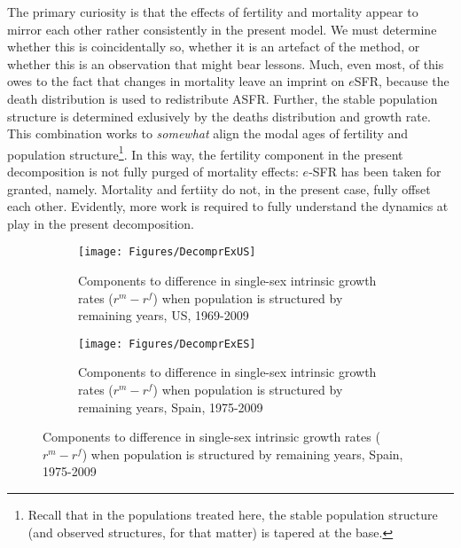 The primary curiosity is that the effects of fertility and mortality appear to
mirror each other rather consistently in the present model. We must determine
whether this is coincidentally so, whether it is an artefact of the method, or
whether this is an observation that might bear lessons. Much, even most, of this
owes to the fact that changes in mortality leave an imprint on $e$SFR, because
the death distribution is used to redistribute ASFR. Further, the stable
population structure is determined exlusively by the deaths distribution and
growth rate. This combination works to \textit{somewhat} align the modal ages of
fertility and population structure\footnote{Recall that in the populations
treated here, the stable population structure (and observed structures, for
that matter) is tapered at the base.}. In this way, the fertility component in
the present decomposition is not fully purged of mortality effects: $e$-SFR has
been taken for granted, namely. Mortality and fertiity do not, in the present
case, fully offset each other. Evidently, more work is required to fully
understand the dynamics at play in the present decomposition.

\begin{figure}
        \centering
        \begin{subfigure}
                \centering
                \caption{Components to difference in single-sex intrinsic growth
                rates ($r^m - r^f$) when population is structured by remaining
                years, US, 1969-2009}
                \texttt{[image: Figures/DecomprExUS]}
                \label{fig:exDecomprUS}
        \end{subfigure}
        \begin{subfigure}
                \centering
                \caption{Components to difference in single-sex intrinsic growth
                rates ($r^m - r^f$) when population is structured by remaining
                years, Spain, 1975-2009}
                \texttt{[image: Figures/DecomprExES]}
                \label{fig:exDecomprES}
        \end{subfigure}
\end{figure}


 \FloatBarrier























